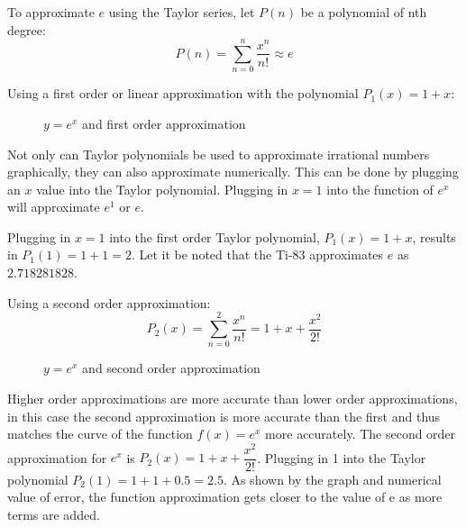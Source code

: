 \documentclass[12pt, titlepage]{article}
\begin{document}
To approximate \(e\) using the Taylor series, let \(P(n)\) be a polynomial of nth degree:
\begin{equation*}
	P(n) = \sum_{n=0}^{n} \frac{x^{n}}{n!} \approx e
\end{equation*}

Using a first order or linear approximation with the polynomial \(P_{1}(x) = 1 + x\):
\begin{figure}[H]
\centering
    \caption[]{\(y=e^x\) and first order approximation}
\end{figure}

Not only can Taylor polynomials be used to approximate irrational numbers graphically, they can also approximate numerically. This can be done by plugging an \(x\) value into the Taylor polynomial. Plugging in \(x = 1\) into the function of \(e^x\) will  approximate \(e^1\) or \(e\). 

Plugging in \(x = 1\) into the first order Taylor polynomial, \(P_{1}(x) = 1 + x\), results in \(P_{1}(1) = 1 + 1 = 2\). Let it be noted that the Ti-83 approximates \(e\) as \(2.718281828\).

Using a second order approximation:
\begin{equation*}
	P_{2}(x) = \sum_{n=0}^{2} \dfrac{x^{n}}{n!} = 1 + x + \dfrac{x^{2}}{2!}
\end{equation*}

\begin{figure}[H]
\centering
    \caption[]{\(y=e^x\) and second order approximation}
\end{figure}

Higher order approximations are more accurate than lower order approximations, in this case the second approximation is more accurate than the first and thus matches the curve of the function \(f(x) = e^{x}\) more accurately. The second order approximation for \(e^{x}\) is \(P_{2}(x) = 1 + x + \dfrac{x^2}{2!}\). Plugging in 1 into the Taylor polynomial \(P_{2}(1) = 1 + 1 + 0.5 = 2.5\). As shown by the graph and numerical value of error, the function approximation gets closer to the value of e as more terms are added.
\end{document}

